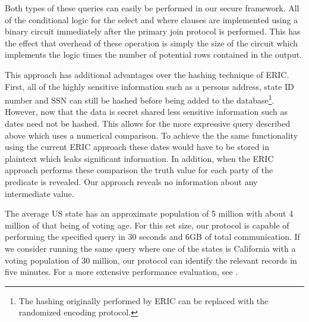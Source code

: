 Both types of these queries can easily be performed in our secure framework. All of the conditional logic for the select and where clauses are implemented using a binary circuit immediately after the primary join protocol is performed. This has the effect that overhead of these operation is simply the size of the circuit which implements the logic times the number of potential rows contained in the output. 

This approach has additional advantages over the hashing technique of ERIC. First, all of the highly sensitive information such as a persons address, state ID number and SSN can still be hashed before being added to the database\footnote{The hashing originally performed by ERIC can be replaced with the randomized encoding protocol.}. However, now that the data is secret shared less sensitive information such as dates need not be hashed. This allows for the more expressive query described above which uses a numerical comparison. To achieve the the same functionality using the current ERIC approach these dates would have to be stored in plaintext which leaks significant information. In addition, when the ERIC approach performs these comparison the truth value for each party of the predicate is revealed. Our approach reveals no information about any intermediate value. 

The average US state has an approximate population of 5 million with about 4 million of that being of voting age. For this set size, our protocol is capable of performing the specified query in 30 seconds and 6GB of total communication. If we consider running the same query where one of the states is California with a voting population of 30 million, our protocol can identify the relevant records in five minutes. For a more extensive performance evaluation, see .


